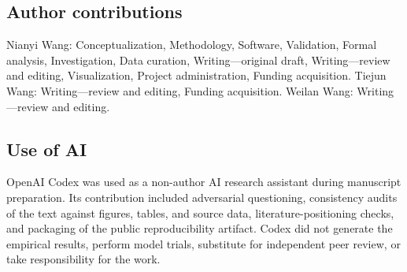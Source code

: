 \documentclass[pdflatex,sn-basic]{sn-jnl}
\begin{document}
\subsection*{Author contributions}
Nianyi Wang: Conceptualization, Methodology, Software, Validation, Formal
analysis, Investigation, Data curation, Writing---original draft, Writing---review
and editing, Visualization, Project administration, Funding acquisition.
Tiejun Wang: Writing---review and editing, Funding acquisition.
Weilan Wang: Writing---review and editing.

\subsection*{Use of AI}
OpenAI Codex was used as a non-author AI research assistant during manuscript
preparation. Its contribution included adversarial questioning, consistency audits of the text against figures, tables, and source
data, literature-positioning checks, and
packaging of the public reproducibility artifact. Codex did not generate the
empirical results, perform model trials, substitute for independent peer review,
or take responsibility for the work.

\footnotesize

\end{document}

